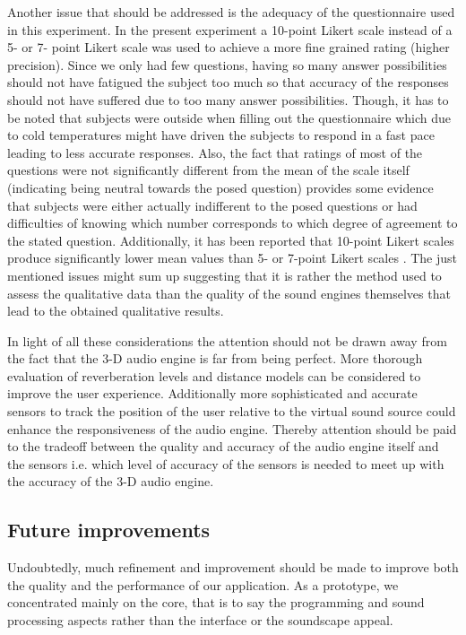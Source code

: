 \documentclass[journal]{IEEEtran}
\begin{document}
Another issue that should be addressed is the adequacy of the questionnaire used in this experiment. In the present experiment a 10-point Likert scale instead of a 5- or 7- point Likert scale was used to achieve a more fine grained rating (higher precision). Since we only had few questions, having so many answer possibilities should not have fatigued the subject too much so that accuracy of the responses should not have suffered due to too many answer possibilities. Though, it has to be noted that subjects were outside when filling out the questionnaire which due to cold temperatures might have driven the subjects to respond in a fast pace leading to less accurate responses. Also, the fact that ratings of most of the questions were not significantly different from the mean of the scale itself (indicating being neutral towards the posed question) provides some evidence that subjects were either actually indifferent to the posed questions or had difficulties of knowing which number corresponds to which degree of agreement to the stated question. Additionally, it has been reported that 10-point Likert scales produce significantly lower mean values than 5- or 7-point Likert scales \cite{Dawes2012}. The just mentioned issues might sum up suggesting that it is rather the method used to assess the qualitative data than the quality of the sound engines themselves that lead to the obtained qualitative results. 

In light of all these considerations the attention should not be drawn away from the fact that the 3-D audio engine is far from being perfect. More thorough evaluation of reverberation levels and distance models can be considered to improve the user experience. Additionally more sophisticated and accurate sensors to track the position of the user relative to the virtual sound source could enhance the responsiveness of the audio engine. Thereby attention should be paid to the tradeoff between the quality and accuracy of the audio engine itself and the sensors i.e. which level of accuracy of the sensors is needed to meet up with the accuracy of the 3-D audio engine. 

\subsection{Future improvements}
Undoubtedly, much refinement and improvement should be made to improve both the quality and the performance of our application. As a prototype, we concentrated mainly on the core, that is to say the programming and sound processing aspects rather than the interface or the soundscape appeal. \\
\end{document}
